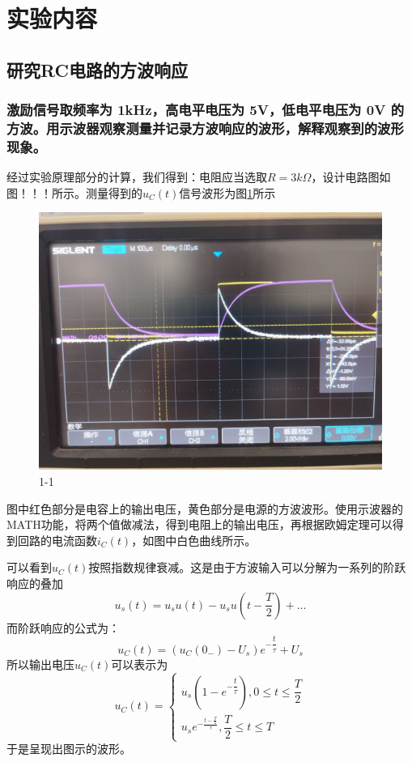 \documentclass{ctexart}
\begin{document}
\section{实验内容}
\subsection{研究RC电路的方波响应}
\subsubsection{激励信号取频率为 1kHz，高电平电压为 5V，低电平电压为 0V 的方波。用示波器观察测量并记录方波响应的波形，解释观察到的波形现象。}
经过实验原理部分的计算，我们得到：电阻应当选取$R=3k\Omega$，设计电路图如图！！！所示。测量得到的$u_C(t)$信号波形为图\ref{fig:1-1}所示
\begin{figure}
    \centering
    \includegraphics[scale=0.2]{pic/1_1.jpg}
    \caption{1-1}
    \label{fig:1-1}
\end{figure}
图中红色部分是电容上的输出电压，黄色部分是电源的方波波形。使用示波器的MATH功能，将两个值做减法，得到电阻上的输出电压，再根据欧姆定理可以得到回路的电流函数$i_C(t)$，如图中白色曲线所示。

可以看到$u_C(t)$按照指数规律衰减。这是由于方波输入可以分解为一系列的阶跃响应的叠加
\begin{equation}
    u_s(t)=u_s u(t)-u_s u(t-\dfrac{T}{2})+\dots
\end{equation}
而阶跃响应的公式为：
\begin{equation}
    u_C(t)=(u_C(0_{-})-U_s)e^{-\dfrac{t}{\tau}}+U_s
\end{equation}
所以输出电压$u_C(t)$可以表示为
\begin{equation}
    u_C(t)=
    \begin{cases}
        u_s(1-e^{-\dfrac{t}{\tau}}),0\leq t\leq \dfrac{T}{2}\\
        u_s e^{-\frac{t-\frac{T}{2}}{\tau}},\dfrac{T}{2}\leq t\leq T
    \end{cases}
\end{equation}
于是呈现出图示的波形。
\end{document}
